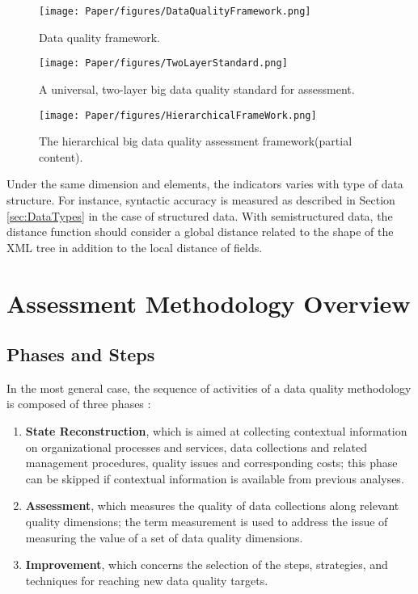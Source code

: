 \documentclass[pdftex,english,oribibl]{llncs}
\begin{document}
  \begin{figure}
    \centering
    \texttt{[image: Paper/figures/DataQualityFramework.png]}
    \caption{Data quality framework.}
    \label{fig:dataqualityframework}
  \end{figure}

  \begin{figure}
    \centering
    \texttt{[image: Paper/figures/TwoLayerStandard.png]}
    \caption{A universal, two-layer big data quality standard for assessment.}
    \label{fig:twolayerstandard}
  \end{figure}

\begin{figure}
    \centering
    \texttt{[image: Paper/figures/HierarchicalFrameWork.png]}
    \caption{The hierarchical big data quality assessment framework(partial content).}
    \label{fig:hierachicalframwork}
 \end{figure}
Under the same dimension and elements, the indicators varies with type of data structure.
 For instance, syntactic accuracy is measured as described in Section \ref{sec:DataTypes} in the case of structured data. With semistructured data, the distance function should consider a global distance related to the shape of the XML tree in addition to the local distance of fields.

\section{Assessment Methodology Overview}

\subsection{Phases and Steps}
In the most general case, the sequence of activities of a data quality methodology is composed of three phases \cite{Batini2009MethodologiesForDataQuality}:

\begin{enumerate}
    \item \textbf{State Reconstruction}, which is aimed at collecting contextual information on organizational processes and services, data collections and related management procedures, quality issues and corresponding costs; this phase can be skipped if contextual information is available from previous analyses.
    \item \textbf{Assessment}, which measures the quality of data collections along relevant quality dimensions; the term measurement is used to address the issue of measuring the value of a set of data quality dimensions.
    \item \textbf{Improvement}, which concerns the selection of the steps, strategies, and techniques for reaching new data quality targets.
\end{enumerate}
\end{document}
